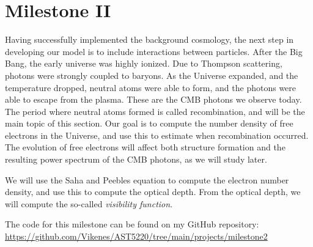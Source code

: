 \section{Milestone II}\label{M2}
Having successfully implemented the background cosmology, the next step in 
developing our model is to include interactions between particles. After the Big Bang, the early universe was highly ionized. Due to Thompson scattering, photons were strongly coupled to baryons. As the Universe expanded, and the temperature dropped, neutral atoms were able to form, and the photons were able to escape from the plasma. These are the CMB photons we observe today. The period where neutral atoms formed is called recombination, and will be the main topic of this section. Our goal is to compute the number density of free electrons in the Universe, and use this to estimate when recombination occurred. The evolution of free electrons will affect both structure formation and the resulting power spectrum of the CMB photons, as we will study later.

We will use the Saha and Peebles equation to compute the electron number density, and use this to compute the optical depth. From the optical depth, we will compute the so-called \textit{visibility function}.   


The code for this milestone can be found on my GitHub repository: \url{https://github.com/Vikenes/AST5220/tree/main/projects/milestone2}





